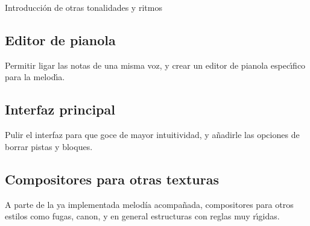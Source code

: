 \documentclass[a4paper,11pt]{article}
\begin{document}
Introducci\'on de otras tonalidades y ritmos

\subsection {Editor de pianola}

Permitir ligar las notas de una misma voz, y crear un editor de pianola espec\'\i fico para la melod\'\i a.

\subsection {Interfaz principal}

Pulir el interfaz para que goce de mayor intuitividad, y a\~nadirle las opciones de borrar pistas y bloques.

\subsection {Compositores para otras texturas}

A parte de la ya implementada melod\'ia acompa\~nada, compositores para otros estilos como fugas, canon, y en general estructuras con reglas muy r\'\i gidas.
\end{document}
